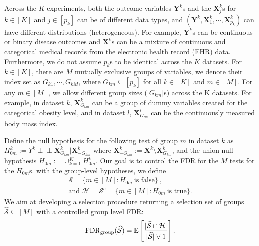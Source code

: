\documentclass[11pt]{article}
\theoremstyle{plain}
\theoremstyle{definition}
\theoremstyle{remark}
\newcommand{\EE}[1]{\mathbb{E}\left[{#1}\right]} %
\newcommand{\X}{\mathbf{X}}
\newcommand{\Y}{\mathbf{Y}}
\newcommand{\0}{\mathbf{0}}
\newcommand{\fdr}{\textnormal{FDR}}
\newcommand{\gfdr}{\fdr_{\textnormal{group}}}
\newcommand{\indep}{\perp \!\!\! \perp}
\begin{document}
 Across the $K$ experiments, both the outcome variables $\Y^k$s and the $\X_j^k$s for $k \in [K]$ and $j \in [p_k]$ can be of different data types, and $(\Y^k, \X_1^k,\cdots, \X_{p_k}^k)$ can have different distributions (heterogeneous). %
 For example, $\Y^k$s can be continuous or binary disease outcomes and $\X^k$s can be a mixture of continuous and categorical medical records from the electronic health record (EHR) data. Furthermore, we do not assume $p_k$s to be identical across the $K$ datasets. For $k\in [K]$, there are $M$ mutually exclusive groups of variables, we denote their index set as $G_{k1}, \cdots, G_{kM}$, where $G_{km}\subseteq [p_k]$ for all $k \in [K]$ and $m \in [M]$. For any $m \in [M]$, we allow different group sizes ($|G_{km}|$s) across the K datasets. For example, in dataset $k$, $\X^k_{G_{km}}$ can be a group of dummy variables created for the categorical obesity level, and in dataset $l$, $\X^l_{G_{lm}}$ can be the continuously measured body mass index.  
 
 Define the null hypothesis for the following test of group $m$ in dataset $k$ as $H_{0m}^k:= Y^k \indep \X^k_{G_{km}}|\X^k_{-G_{km}}$ where $\X^k_{-G_{km}} := \X^k \setminus \X^k_{G_{km}}$, and the union null hypothesis $H_{0m} :=\cup_{k=1}^KH_{0m}^k$. Our goal is to control the FDR for the $M$ tests for the $H_{0m}$s. with the group-level hypotheses, we define
\begin{multline}\label{eqn:H}
    \mathcal{S} = \{m\in [M]: H_{0m} ~\text{is false}\}~, \\ \text{and  $\mathcal{H} = \mathcal{S}^c = \{m\in [M]: H_{0m} ~\text{is true}\}$}.
\end{multline} 
We aim at developing a selection procedure returning a selection set of groups $\widehat{\mathcal{S}} \subseteq [M]$ with a controlled group level FDR:  \begin{equation}\label{eqn:fdr}
\gfdr(\widehat{\mathcal{S}}) = \EE{\frac{|\widehat{\mathcal{S}} \cap \mathcal{H}|}{|\widehat{\mathcal{S}}|\vee 1}}.
\end{equation}
\end{document}
